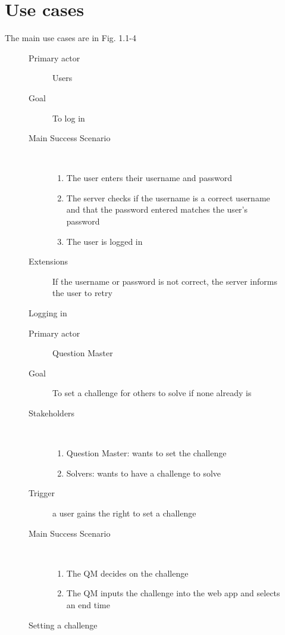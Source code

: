 \documentclass{report}
\begin{document}
\section{Use cases}
The main use cases are in Fig. 1.1-4
{

\begin{figure}[h]
\caption{Logging in}
\begin{description}
\item[Primary actor] Users
\item[Goal] To log in
\item[Main Success Scenario]~
\begin{enumerate}
\item The user enters their username and password
\item The server checks if the username is a correct username and that the password entered matches the user’s password
\item The user is logged in
\end{enumerate}
\item[Extensions] If the username or password is not correct, the server informs the user to retry
\end{description}
\end{figure}

\begin{figure}[h]
\caption{Setting a challenge}
\begin{description}
\item[Primary actor] Question Master
\item[Goal] To set a challenge for others to solve if none already is
\item[Stakeholders]~
\begin{enumerate}
\item Question Master: wants to set the challenge
\item Solvers: wants to have a challenge to solve
\end{enumerate}
\item[Trigger] a user gains the right to set a challenge
\item[Main Success Scenario]~
\begin{enumerate}
\item The QM decides on the challenge
\item The QM inputs the challenge into the web app and selects an end time
\end{enumerate}
\end{description}
\end{figure}

}
\end{document}
